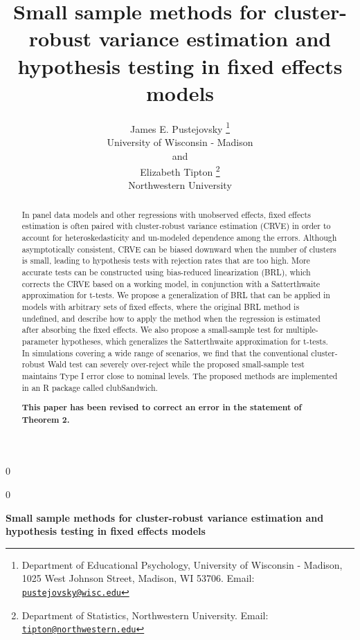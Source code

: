 \documentclass[12pt]{article}
\newcommand{\blind}{0}
\begin{document}
\def\spacingset#1{\renewcommand{\baselinestretch}%
{#1}\small\normalsize} \spacingset{1}



\blind
{
  \title{\bf Small sample methods for cluster-robust variance estimation
and hypothesis testing in fixed effects models}

  \author{
        James E. Pustejovsky \thanks{Department of Educational
Psychology, University of Wisconsin - Madison, 1025 West Johnson Street,
Madison, WI 53706. Email:
\href{mailto:pustejovsky@wisc.edu}{\nolinkurl{pustejovsky@wisc.edu}}} \\
    University of Wisconsin - Madison\\
     and \\     Elizabeth Tipton \thanks{Department of Statistics,
Northwestern University. Email:
\href{mailto:tipton@northwestern.edu}{\nolinkurl{tipton@northwestern.edu}}} \\
    Northwestern University\\
      }
  \maketitle
} \fi

\blind
{
  \bigskip
  \bigskip
  \bigskip
  \begin{center}
    {\LARGE\bf Small sample methods for cluster-robust variance
estimation and hypothesis testing in fixed effects models}
  \end{center}
  \medskip
} \fi

\bigskip
\begin{abstract}
In panel data models and other regressions with unobserved effects,
fixed effects estimation is often paired with cluster-robust variance
estimation (CRVE) in order to account for heteroskedasticity and
un-modeled dependence among the errors. Although asymptotically
consistent, CRVE can be biased downward when the number of clusters is
small, leading to hypothesis tests with rejection rates that are too
high. More accurate tests can be constructed using bias-reduced
linearization (BRL), which corrects the CRVE based on a working model,
in conjunction with a Satterthwaite approximation for t-tests. We
propose a generalization of BRL that can be applied in models with
arbitrary sets of fixed effects, where the original BRL method is
undefined, and describe how to apply the method when the regression is
estimated after absorbing the fixed effects. We also propose a
small-sample test for multiple-parameter hypotheses, which generalizes
the Satterthwaite approximation for t-tests. In simulations covering a
wide range of scenarios, we find that the conventional cluster-robust
Wald test can severely over-reject while the proposed small-sample test
maintains Type I error close to nominal levels. The proposed methods are
implemented in an R package called clubSandwich.

\textbf{This paper has been revised to correct an error in the statement
of Theorem 2.}
\end{abstract}
\end{document}
